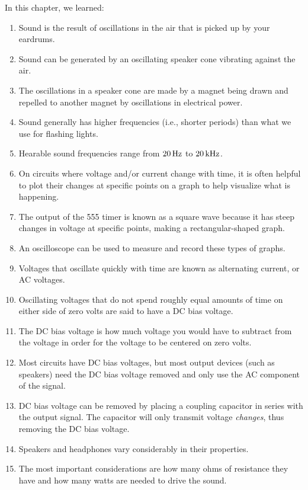 \reviewsection

In this chapter, we learned:

\begin{enumerate}
\item Sound is the result of oscillations in the air that is picked up by your eardrums.
\item Sound can be generated by an oscillating speaker cone vibrating against the air.
\item The oscillations in a speaker cone are made by a magnet being drawn and repelled to another magnet by oscillations in electrical power.
\item Sound generally has higher frequencies (i.e., shorter periods) than what we use for flashing lights.
\item Hearable sound frequencies range from $20\,\si{\hertz}$ to $20\,\si{\kilo\hertz}$.
\item On circuits where voltage and/or current change with time, it is often helpful to plot their changes at specific points on a graph to help visualize what is happening.
\item The output of the 555 timer is known as a square wave because it has steep changes in voltage at specific points, making a rectangular-shaped graph.
\item An oscilloscope can be used to measure and record these types of graphs.
\item Voltages that oscillate quickly with time are known as alternating current, or AC voltages. 
\item Oscillating voltages that do not spend roughly equal amounts of time on either side of zero volts are said to have a DC bias voltage.
\item The DC bias voltage is how much voltage you would have to subtract from the voltage in order for the voltage to be centered on zero volts.  
\item Most circuits have DC bias voltages, but most output devices (such as speakers) need the DC bias voltage removed and only use the AC component of the signal.
\item DC bias voltage can be removed by placing a coupling capacitor in series with the output signal.  The capacitor will only transmit voltage \emph{changes}, thus removing the DC bias voltage.
\item Speakers and headphones vary considerably in their properties.
\item The most important considerations are how many ohms of resistance they have and how many watts are needed to drive the sound.

\end{enumerate}
